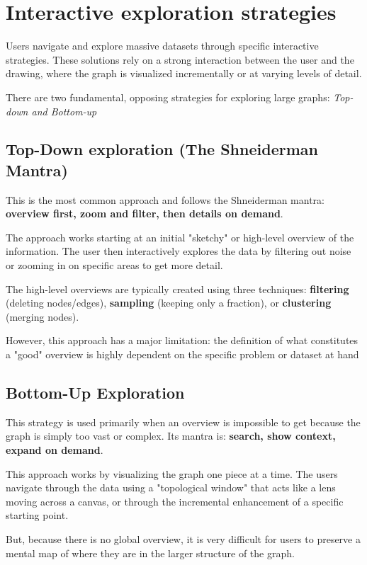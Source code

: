 \section{Interactive exploration strategies}
Users navigate and explore massive datasets through specific interactive strategies. These solutions rely on a strong interaction between the user and the drawing, where the graph is visualized incrementally or at varying levels of detail. \par
There are two fundamental, opposing strategies for exploring large graphs: \textit{Top-down and Bottom-up}

\subsection{Top-Down exploration (The Shneiderman Mantra)}
This is the most common approach and follows the Shneiderman mantra: \textbf{overview first, zoom and filter, then details on demand}.\par
The approach works starting at an initial "sketchy" or high-level overview of the information. The user then interactively explores the data by filtering out noise or zooming in on specific areas to get more detail. \par
The high-level overviews are typically created using three techniques: \textbf{filtering} (deleting nodes/edges), \textbf{sampling} (keeping only a fraction), or \textbf{clustering} (merging nodes).\par
However, this approach has a major limitation: the definition of what constitutes a "good" overview is highly dependent on the specific problem or dataset at hand

\subsection{Bottom-Up Exploration}
This strategy is used primarily when an overview is impossible to get because the graph is simply too vast or complex. Its mantra is: \textbf{search, show context, expand on demand}. \par
This approach works by visualizing the graph one piece at a time. The users navigate through the data using a "topological window" that acts like a lens moving across a canvas, or through the incremental enhancement of a specific starting point.\par
But, because there is no global overview, it is very difficult for users to preserve a mental map of where they are in the larger structure of the graph.

